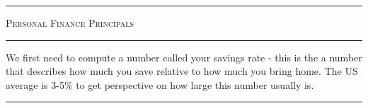 \documentclass[landscape]{article}
\title{}
\author{}
\newcommand{\myline}{\vspace{4pt}\hrule  \vspace{4pt}}
\newenvironment{topic}[1]{
	\noindent \textbf{\textsc{\color{harvardcrimson}{#1}}}
	\noindent \hspace{-3.5pt}
}{
	\myline
}
\begin{document}
	\footnotesize

	\begin{multicols*}{3}
	\hfill
	\vspace{-1\baselineskip}
	\hfill
	
	\myline
	\vspace{-0.2cm}
	\begin{center}
		\LARGE \textsc{Personal Finance Principals} 
	\end{center}
	\vspace{-0.2cm}
	\myline 
	
	\newcommand{\blank}{\_\_\_\_\_\_\_\_\_\_\_\_}
	\begin{topic}{Numbers Game}
		We first need to compute a number called your savings rate - this is the a number that describes how much you save relative to how much you bring home. The US average is 3-5\% to get perspective on how large this number usually is. 
		

\end{topic}
\end{multicols*}
\end{document}
